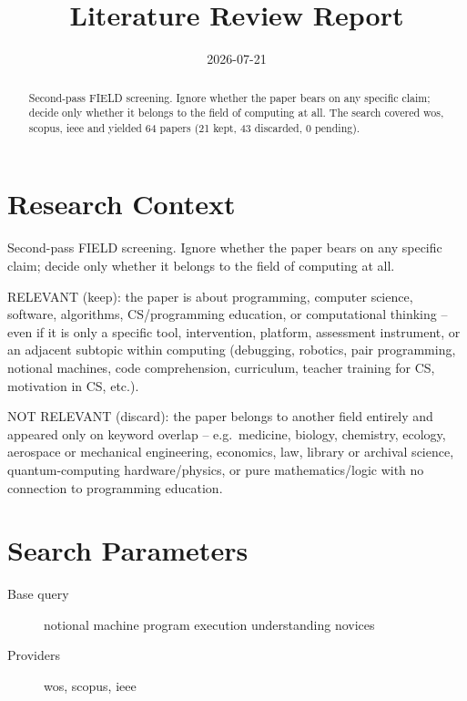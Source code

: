 \documentclass{article}
\title{Literature Review Report}
\date{2026-07-21}
\begin{document}
\maketitle

\begin{abstract}
Second-pass FIELD screening. Ignore whether the paper bears on any specific claim; decide only whether it belongs to the field of computing at all. The search covered wos, scopus, ieee and yielded 64 papers (21 kept, 43 discarded, 0 pending).
\end{abstract}
\clearpage
\clearpage
\tableofcontents
\clearpage

\section{Research Context}
Second-pass FIELD screening. Ignore whether the paper bears on any
specific claim; decide only whether it belongs to the field of computing
at all.

RELEVANT (keep): the paper is about programming, computer science,
software, algorithms, CS/programming education, or computational
thinking -- even if it is only a specific tool, intervention, platform,
assessment instrument, or an adjacent subtopic within computing
(debugging, robotics, pair programming, notional machines, code
comprehension, curriculum, teacher training for CS, motivation in CS,
etc.).

NOT RELEVANT (discard): the paper belongs to another field entirely and
appeared only on keyword overlap -- e.g.~medicine, biology, chemistry,
ecology, aerospace or mechanical engineering, economics, law, library or
archival science, quantum-computing hardware/physics, or pure
mathematics/logic with no connection to programming education.

\section{Search Parameters}

\begin{description}
\item[Base query] notional machine program execution understanding novices
\item[Providers] wos, scopus, ieee
\end{description}
\end{document}
